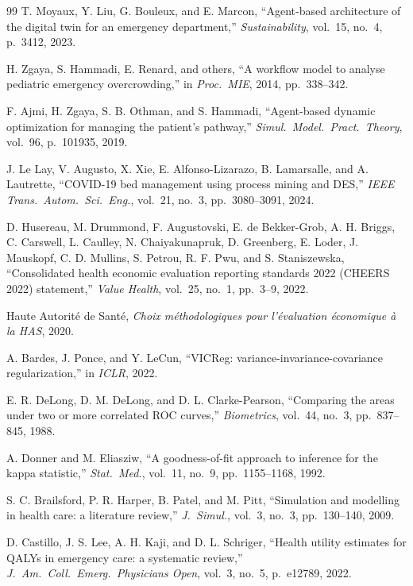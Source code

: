 \documentclass[conference]{IEEEtran}
\begin{document}
\begin{thebibliography}{99}
T. Moyaux, Y. Liu, G. Bouleux, and E. Marcon, ``Agent-based architecture of the digital twin for an emergency department,'' \emph{Sustainability}, vol.~15, no.~4, p.~3412, 2023.

H. Zgaya, S. Hammadi, E. Renard, and others, ``A workflow model to analyse pediatric emergency overcrowding,'' in \emph{Proc.\ MIE}, 2014, pp.~338--342.

F. Ajmi, H. Zgaya, S. B. Othman, and S. Hammadi, ``Agent-based dynamic optimization for managing the patient's pathway,'' \emph{Simul.\ Model.\ Pract.\ Theory}, vol.~96, p.~101935, 2019.

J. Le Lay, V. Augusto, X. Xie, E. Alfonso-Lizarazo, B. Lamarsalle, and A. Lautrette, ``COVID-19 bed management using process mining and DES,'' \emph{IEEE Trans.\ Autom.\ Sci.\ Eng.}, vol.~21, no.~3, pp.~3080--3091, 2024.

D. Husereau, M. Drummond, F. Augustovski, E. de Bekker-Grob, A. H. Briggs, C. Carswell, L. Caulley, N. Chaiyakunapruk, D. Greenberg, E. Loder, J. Mauskopf, C. D. Mullins, S. Petrou, R. F. Pwu, and S. Staniszewska, ``Consolidated health economic evaluation reporting standards 2022 (CHEERS 2022) statement,'' \emph{Value Health}, vol.~25, no.~1, pp.~3--9, 2022.

Haute Autorit\'e de Sant\'e, \emph{Choix m\'ethodologiques pour l'\'evaluation \'economique \`a la HAS}, 2020.

A. Bardes, J. Ponce, and Y. LeCun, ``VICReg: variance-invariance-covariance regularization,'' in \emph{ICLR}, 2022.

E. R. DeLong, D. M. DeLong, and D. L. Clarke-Pearson, ``Comparing the areas under two or more correlated ROC curves,'' \emph{Biometrics}, vol.~44, no.~3, pp.~837--845, 1988.

A. Donner and M. Eliasziw, ``A goodness-of-fit approach to inference for the kappa statistic,'' \emph{Stat.\ Med.}, vol.~11, no.~9, pp.~1155--1168, 1992.

S. C. Brailsford, P. R. Harper, B. Patel, and M. Pitt, ``Simulation and modelling in health care: a literature review,'' \emph{J.\ Simul.}, vol.~3, no.~3, pp.~130--140, 2009.

D. Castillo, J. S. Lee, A. H. Kaji, and D. L. Schriger, ``Health utility estimates for QALYs in emergency care: a systematic review,'' \emph{J.\ Am.\ Coll.\ Emerg.\ Physicians Open}, vol.~3, no.~5, p.~e12789, 2022.

\end{thebibliography}
\end{document}
